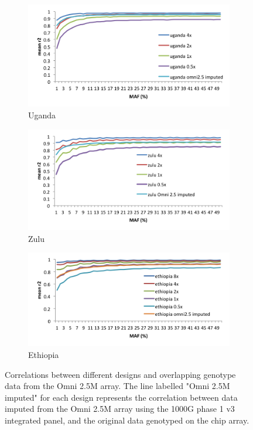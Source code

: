 \begin{figure}
        \centering
        \begin{subfigure}[b]{0.75\textwidth}
                \includegraphics[width=\textwidth]{fig/SN12f5a}
                \caption{Uganda}
                \label{fig:SN12f5uganda}
        \end{subfigure}%

        \begin{subfigure}[b]{0.75\textwidth}
                \includegraphics[width=\textwidth]{fig/SN12f5b}
                \caption{Zulu}
                \label{fig:zulu}
        \end{subfigure}

        \begin{subfigure}[b]{0.75\textwidth}
                \includegraphics[width=\textwidth]{fig/SN12f5c}
                \caption{Ethiopia}
                \label{fig:ethiopia}
        \end{subfigure}
        \caption{Correlations between different designs and overlapping genotype data from the Omni 2.5M array. The line labelled "Omni 2.5M imputed" for each design represents the correlation between data imputed from the Omni 2.5M array using the \gls{1000G} phase 1 v3 integrated panel, and the original data genotyped on the chip array.}
        \label{fig:SN12}
\end{figure}